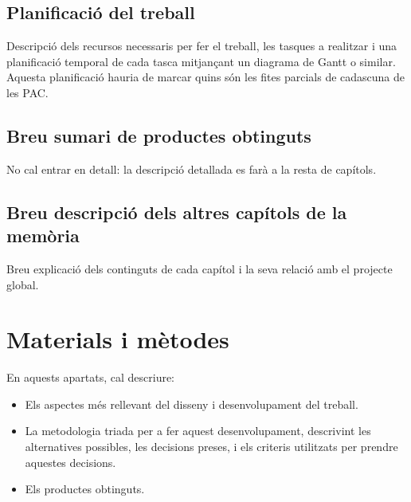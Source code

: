\documentclass[CAT]{TFUOC}%
\begin{document}
\section{Planificació del treball}

Descripció dels recursos necessaris per fer el treball, les tasques a realitzar i una planificació temporal de cada tasca mitjançant un diagrama de Gantt o similar. Aquesta planificació hauria de marcar quins són les fites parcials de cadascuna de les PAC.



\section{Breu sumari de productes obtinguts}

No cal entrar en detall: la descripció detallada es farà a la resta de capítols.


\section{Breu descripció dels altres capítols de la memòria}

Breu explicació dels continguts de cada capítol i la seva relació amb el projecte global.



\chapter{Materials i mètodes}
En aquests apartats, cal descriure:
\begin{itemize}
    \item Els aspectes més rellevant del disseny i desenvolupament del treball.
    \item La metodologia triada per a fer aquest desenvolupament, descrivint les alternatives possibles, les decisions preses, i els criteris utilitzats per prendre aquestes decisions.
    \item Els productes obtinguts.
\end{itemize}
\end{document}
